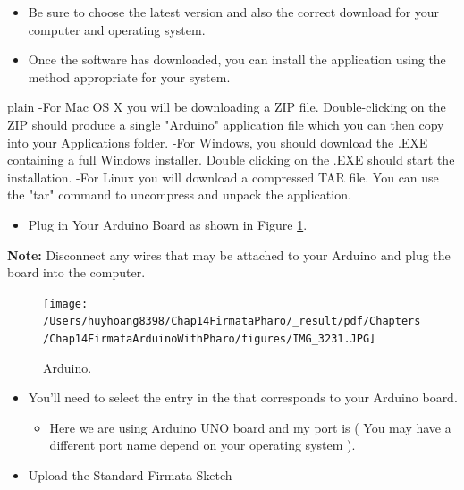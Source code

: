 \documentclass[10pt,twoside,english]{_support/latex/sbabook/sbabook}
\begin{document}
\begin{itemize}
\item Be sure to choose the latest version and also the correct download for your computer and operating system.
\item Once the software has downloaded, you can install the application using the method appropriate for your system. 
\end{itemize}

\begin{displaycode}{plain}
  -For Mac OS X you will be downloading a ZIP file. Double-clicking on the ZIP should produce a single "Arduino" application file which you can then copy into your Applications folder.
  -For Windows, you should download the .EXE containing a full Windows installer. Double clicking on the .EXE should start the installation.
  -For Linux you will download a compressed TAR file. You can use the "tar" command to uncompress and unpack the application.
\end{displaycode}

\begin{itemize}
\item Plug in Your Arduino Board as shown in Figure \ref{ArduinoConnection}.
\end{itemize}

\textbf{Note:} Disconnect any wires that may be attached to your Arduino and plug the board into the computer.

\begin{figure}

\begin{center}
\texttt{[image: /Users/huyhoang8398/Chap14FirmataPharo/\_result/pdf/Chapters/Chap14FirmataArduinoWithPharo/figures/IMG\_3231.JPG]}\caption{Arduino.\label{ArduinoConnection}}\end{center}
\end{figure}


\begin{itemize}
\item You'll need to select the entry in the  that corresponds to your Arduino board. 
\begin{itemize}
\item Here we are using Arduino UNO board and my port is  ( You may have a different port name depend on your operating system ).
\end{itemize}

\item Upload the Standard Firmata Sketch
\end{itemize}
\end{document}

